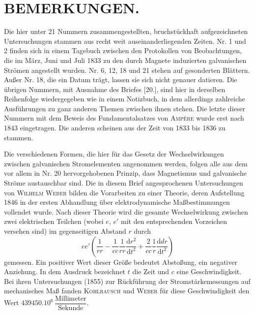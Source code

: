 \section*{BEMERKUNGEN.}
\par\nopagebreak[4]\smallskip\noindent\makebox[\linewidth][c]{\rule{.08\linewidth}{.35pt}}\par

Die hier unter 21 Nummern zusammengestellten, bruchstückhaft aufgezeichneten Untersuchungen stammen aus recht weit auseinanderliegenden Zeiten. Nr. 1 und 2 finden sich in einem Tagebuch zwischen den Protokollen von Beobachtungen, die im März, Juni und Juli 1833 zu den durch Magnete induzierten galvanischen Strömen angestellt wurden. Nr. 6, 12, 18 und 21 stehen auf gesonderten Blättern. Außer Nr. 18, die ein Datum trägt, lassen sie sich nicht genauer datieren. Die übrigen Nummern, mit Ausnahme des Briefes [20.], sind hier in derselben Reihenfolge wiedergegeben wie in einem Notizbuch, in dem allerdings zahlreiche Ausführungen zu ganz anderen Themen zwischen ihnen stehen. Die letzte dieser Nummern mit dem Beweis des Fundamentalsatzes von \textsc{Ampère} wurde erst nach 1843 eingetragen. Die anderen scheinen aus der Zeit von 1833 bis 1836 zu stammen.

Die verschiedenen Formen, die hier für das Gesetz der Wechselwirkungen zwischen galvanischen Stromelementen angenommen werden, folgen alle aus dem vor allem in Nr. 20 hervorgehobenen Prinzip, dass Magnetismus und galvanische Ströme austauschbar sind. Die in diesem Brief angesprochenen Untersuchungen von \textsc{Wilhelm Weber} bilden die Vorarbeiten zu einer Theorie, deren Aufstellung 1846 in der ersten Abhandlung über elektrodynamische Maßbestimmungen vollendet wurde. Nach dieser Theorie wird die gesamte Wechselwirkung zwischen zwei elektrischen Teilchen (wobei $e$, $e'$ mit den entsprechenden Vorzeichen versehen sind) im gegenseitigen Abstand $r$ durch
\[
ee'\left(\frac1{rr}-\frac1{cc}\frac1{rr}\frac{\mathrm dr^2}{\mathrm dt^2}+\frac2{cc}\frac1r\frac{\mathrm ddr}{\mathrm dt^2}\right)
\]
gemessen. Ein positiver Wert dieser Größe bedeutet Abstoßung, ein negativer Anziehung. In dem Ausdruck bezeichnet $t$ die Zeit und $c$ eine Geschwindigkeit. Bei ihren Untersuchungen (1855) zur Rückführung der Stromstärkemessungen auf mechanisches Maß fanden \textsc{Kohlrausch} und \textsc{Weber} für diese Geschwindigkeit den Wert $439450.10^6\,\dfrac{\text{Millimeter}}{\text{Sekunde}}$.


